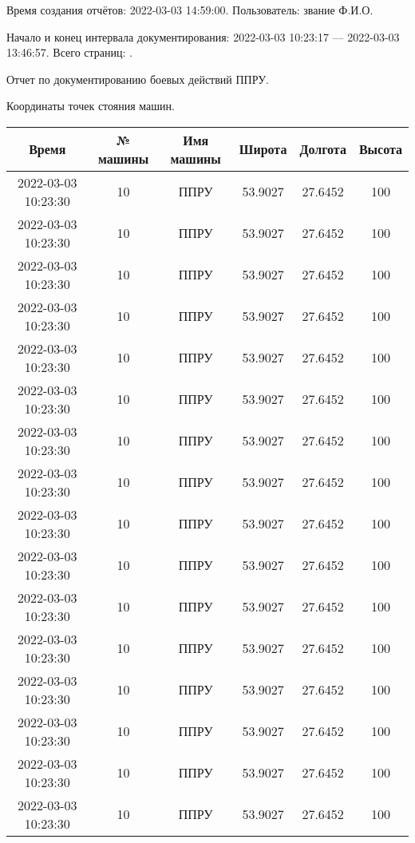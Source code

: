 ﻿\documentclass[a4paper]{article}
\begin{document}
    Время создания отчётов: 2022-03-03 14:59:00.
    Пользователь: звание Ф.И.О.

    Начало и конец интервала документирования: 2022-03-03 10:23:17 — 2022-03-03 13:46:57.
    Всего страниц: \pageref{LastPage}.

    Отчет по документированию боевых действий ППРУ.

    Координаты точек стояния машин.

    \begin{center}
        \begin{longtable}{|c|c|c|c|c|c|} \hline
            \textbf{Время} & \textbf{№ машины} & \textbf{Имя машины} & \textbf{Широта} & \textbf{Долгота} & \textbf{Высота} \\ \hline
            2022-03-03 10:23:30 & 10 & ППРУ & 53.9027 & 27.6452 & 100 \\ \hline
            2022-03-03 10:23:30 & 10 & ППРУ & 53.9027 & 27.6452 & 100 \\ \hline
            2022-03-03 10:23:30 & 10 & ППРУ & 53.9027 & 27.6452 & 100 \\ \hline
            2022-03-03 10:23:30 & 10 & ППРУ & 53.9027 & 27.6452 & 100 \\ \hline
            2022-03-03 10:23:30 & 10 & ППРУ & 53.9027 & 27.6452 & 100 \\ \hline
            2022-03-03 10:23:30 & 10 & ППРУ & 53.9027 & 27.6452 & 100 \\ \hline
            2022-03-03 10:23:30 & 10 & ППРУ & 53.9027 & 27.6452 & 100 \\ \hline
            2022-03-03 10:23:30 & 10 & ППРУ & 53.9027 & 27.6452 & 100 \\ \hline
            2022-03-03 10:23:30 & 10 & ППРУ & 53.9027 & 27.6452 & 100 \\ \hline
            2022-03-03 10:23:30 & 10 & ППРУ & 53.9027 & 27.6452 & 100 \\ \hline
            2022-03-03 10:23:30 & 10 & ППРУ & 53.9027 & 27.6452 & 100 \\ \hline
            2022-03-03 10:23:30 & 10 & ППРУ & 53.9027 & 27.6452 & 100 \\ \hline
            2022-03-03 10:23:30 & 10 & ППРУ & 53.9027 & 27.6452 & 100 \\ \hline
            2022-03-03 10:23:30 & 10 & ППРУ & 53.9027 & 27.6452 & 100 \\ \hline
            2022-03-03 10:23:30 & 10 & ППРУ & 53.9027 & 27.6452 & 100 \\ \hline
            2022-03-03 10:23:30 & 10 & ППРУ & 53.9027 & 27.6452 & 100 \\ \hline

\end{longtable}
\end{center}
\end{document}
